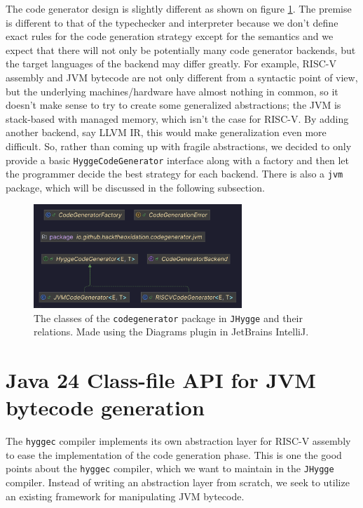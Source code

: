 The code generator design is slightly different as shown on figure \ref{fig:codegenerator_classes}. The premise is different to that of the typechecker and interpreter because we don't define
exact rules for the code generation strategy except for the semantics and we expect that there will not only be potentially many code generator backends,
but the target languages of the backend may differ greatly. For example, RISC-V assembly and JVM bytecode are not only different from a syntactic point
of view, but the underlying machines/hardware have almost nothing in common, so it doesn't make sense to try to create some generalized abstractions;
the JVM is stack-based with managed memory, which isn't the case for RISC-V. By adding another backend, say LLVM IR, this would make generalization
even more difficult. So, rather than coming up with fragile abstractions, we decided to only provide a basic \texttt{HyggeCodeGenerator} interface
along with a factory and then let the programmer decide the best strategy for each backend. There is also a \texttt{jvm} package, which will be
discussed in the following subsection.

\begin{figure}[H]
\centering
\includegraphics[width=0.7\textwidth]{Pictures/Diagrams/codegenerator_classes.png}
\caption{The classes of the \texttt{codegenerator} package in \texttt{JHygge} and their relations. Made using the Diagrams plugin in JetBrains IntelliJ.}
\label{fig:codegenerator_classes}
\end{figure}

\section{Java 24 Class-file API for JVM bytecode generation}

The \texttt{hyggec} compiler implements its own abstraction layer for RISC-V assembly to ease the implementation of the code
generation phase. This is one the good points about the \texttt{hyggec} compiler, which we want to maintain in the \texttt{JHygge}
compiler. Instead of writing an abstraction layer from scratch, we seek to utilize an existing framework for manipulating JVM
bytecode.

